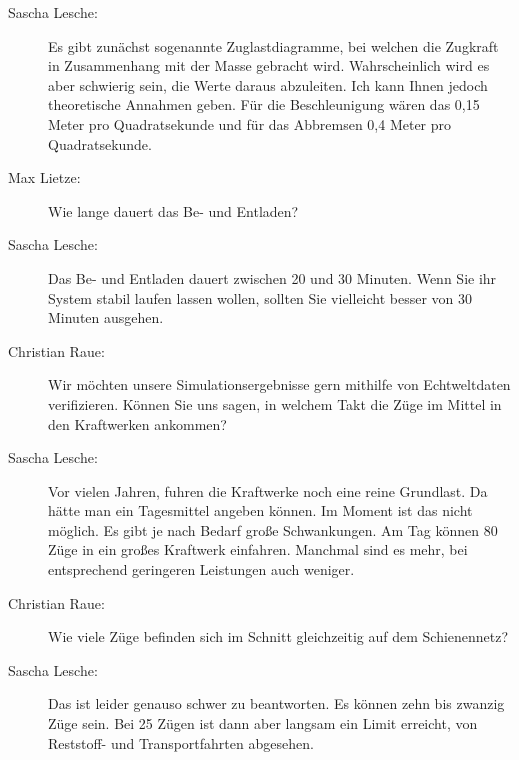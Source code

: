 \begin{description}
    \item[Sascha Lesche:] Es gibt zunächst sogenannte Zuglastdiagramme, bei welchen die Zugkraft in Zusammenhang mit der Masse gebracht wird. Wahrscheinlich wird es aber schwierig sein, die Werte daraus abzuleiten. Ich kann Ihnen jedoch theoretische Annahmen geben. Für die Beschleunigung wären das 0,15 Meter pro Quadratsekunde und für das Abbremsen 0,4 Meter pro Quadratsekunde.

    \item[Max Lietze:] Wie lange dauert das Be- und Entladen?

    \item[Sascha Lesche:] Das Be- und Entladen dauert zwischen 20 und 30 Minuten. Wenn Sie ihr System stabil laufen lassen wollen, sollten Sie vielleicht besser von 30 Minuten ausgehen.

    \item[Christian Raue:] Wir möchten unsere Simulationsergebnisse gern mithilfe von Echtweltdaten verifizieren. Können Sie uns sagen, in welchem Takt die Züge im Mittel in den Kraftwerken ankommen?

    \item[Sascha Lesche:] Vor vielen Jahren, fuhren die Kraftwerke noch eine reine Grundlast. Da hätte man ein Tagesmittel angeben können. Im Moment ist das nicht möglich. Es gibt je nach Bedarf große Schwankungen. Am Tag können 80 Züge in ein großes Kraftwerk einfahren. Manchmal sind es mehr, bei entsprechend geringeren Leistungen auch weniger.

    \item[Christian Raue:] Wie viele Züge befinden sich im Schnitt gleichzeitig auf dem Schienennetz?

    \item[Sascha Lesche:] Das ist leider genauso schwer zu beantworten. Es können zehn bis zwanzig Züge sein. Bei 25 Zügen ist dann aber langsam ein Limit erreicht, von Reststoff- und Transportfahrten abgesehen.

\end{description}